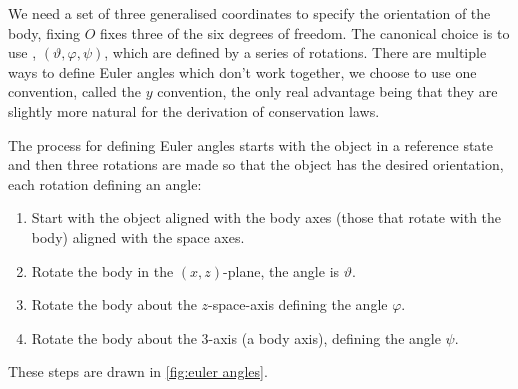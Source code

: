 \documentclass[fleqn]{NotesClass}
\begin{document}
    We need a set of three generalised coordinates to specify the orientation of the body, fixing \(O\) fixes three of the six degrees of freedom.
    The canonical choice is to use , \((\vartheta, \varphi, \psi)\), which are defined by a series of rotations.
    There are multiple ways to define Euler angles which don't work together, we choose to use one convention, called the \(y\) convention, the only real advantage being that they are slightly more natural for the derivation of conservation laws.
    
    The process for defining Euler angles starts with the object in a reference state and then three rotations are made so that the object has the desired orientation, each rotation defining an angle:
    \begin{enumerate}
        \item Start with the object aligned with the body axes (those that rotate with the body) aligned with the space axes.
        \item Rotate the body in the \((x, z)\)-plane, the angle is \(\vartheta\).
        \item Rotate the body about the \(z\)-space-axis defining the angle \(\varphi\).
        \item Rotate the body about the \(3\)-axis (a body axis), defining the angle \(\psi\).
    \end{enumerate}
    These steps are drawn in \cref{fig:euler angles}.
    
\end{document}
